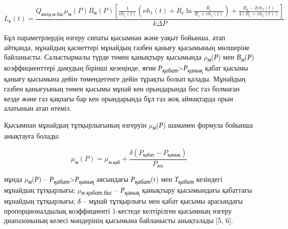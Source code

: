 \begin{equation}
    L_{\text{к}}(t) = \frac{Q_{\text{көлд.м.бас}} \mu_{\text{м}}(P) B_{\text{м}}(P) \left[ \frac{1}{v h_1(t)} \left( \nu h_1(t) + R_{\text{с}} \ln \frac{R_{\text{с}}}{R_{\text{с}} + v h_1(t)} \right) + \frac{R_{\text{к}} - 2v h_1(t)}{4 (R_{\text{с}} + v h_1(t))} \right]}{k \Delta P}
    \end{equation}
    \begin{multicols}{2}
    
Бұл параметрлердің өзгеру сипаты қысымнан және уақыт бойынша, атап
айтқанда, мұнайдың қасиеттері мұнайдың газбен қанығу қысымының мөлшеріне
байланысты. Салыстырмалы түрде төмен қанықтыру қысымында
\emph{µ\textsubscript{м}}(\emph{Р}) мен
\emph{В\textsubscript{м}}(\emph{Р}) коэффициенттері дамудың бірінші
кезеңінде, яғни
\emph{Р\textsubscript{қабат}}\textgreater{}\emph{Р\textsubscript{қанық}}
қабат қысымы қанығу қысымына дейін төмендегенге дейін тұрақты болып
қалады. Мұнайдың газбен қанығуының төмен қысымы мұнай кен орындарында
бос газ болмаған кезде және газ қақпағы бар кен орындарында бұл газ жоқ
аймақтарда орын алатынын атап өтеміз.

Қысымнан мұнайдың тұтқырлығының өзгеруін
\emph{µ\textsubscript{м}}(\emph{Р}) шамамен формула бойынша анықтауға
болады:

\begin{equation}
    \mu_{\text{м}}(P) = \mu_{\text{м.қаб}} + \frac{\delta(P_{\text{қабат}} - P_{\text{қанық}})}{P_{\text{аm}}}
    \end{equation}
  

мұнда \emph{µ\textsubscript{м}}(\emph{Р}) --
\emph{Р\textsubscript{қабат}}\textgreater{}\emph{Р\textsubscript{қанық}}
аясындағы \emph{Р\textsubscript{қабат}}(t) мен
\emph{Т\textsubscript{қабат}} кезіндегі мұнайдың тұтқырлығы;
\emph{µ\textsubscript{м.қабат.бас }}-- \emph{Р\textsubscript{қанық}}
қанықтыру қысымындағы қабаттағы мұнайдың тұтқырлығы; \emph{δ} -- мұнай
тұтқырлығы мен қабат қысымы арасындағы пропорционалдылық коэффициенті
1-кестеде келтірілген қысымның өзгеру диапазонының келесі мәндерінің
қысымына байланысты анықталады {[}5, 6{]}.

\end{multicols} 


